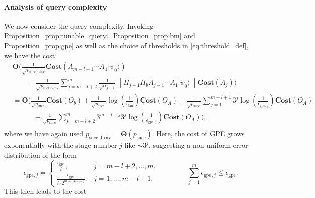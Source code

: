 \documentclass[letterpaper,onecolumn,11pt,accepted=2026-02-14]{quantumarticle}
\newcommand{\norm}[1]{\left\lVert#1\right\rVert}
\theoremstyle{remark}
\theoremstyle{plain}
\newcommand{\eq}[1]{\cref{eq:#1}}
\newcommand{\prop}[1]{\hyperref[prop:#1]{Proposition~\ref*{prop:#1}}}
\newcommand{\ket}[1]{|#1\rangle}
\begin{document}
\paragraph{Analysis of query complexity}
We now consider the query complexity. Invoking \prop{tunable_query}, \prop{bm} and \prop{gpe} as well as the choice of thresholds in \eq{threshold_def}, we have the cost
\begin{equation}
\begin{aligned}
    &\mathbf{O}\Bigg(\frac{1}{\sqrt{p_{\text{succ,d-inv}}}}\mathbf{Cost}\left(A_{m-l+1}\cdots A_{1}\ket{\psi_0}\right)\\
    &\qquad+\frac{1}{\sqrt{p_{\text{succ,d-inv}}}}\sum_{j=m-l+2}^{m}\frac{1}{\sqrt{\alpha_{j-1}}}
    \norm{\overline{\Pi_{j-1}\Pi_b}A_{j-1}\cdots A_1\ket{\psi_0}}\mathbf{Cost}\left(A_{j}\right)\Bigg)\\
    &=\mathbf{O}\Bigg(\frac{1}{\sqrt{p_{\text{succ}}}}\mathbf{Cost}\left(O_b\right)
    +\frac{1}{\sqrt{p_{\text{succ}}}}\log\left(\frac{1}{\epsilon_{\text{bm}}}\right)\mathbf{Cost}\left(O_A\right)
    +\frac{1}{\sqrt{p_{\text{succ}}}}\sum_{j=1}^{m-l+1}3^j\log\left(\frac{1}{\epsilon_{\text{gpe},j}}\right)\mathbf{Cost}(O_A)\\
    &\qquad\quad +\frac{1}{\sqrt{p_{\text{succ}}}}\sum_{j=m-l+2}^{m}3^{m-l-j}3^j\log\left(\frac{1}{\epsilon_{\text{gpe},j}}\right)\mathbf{Cost}\left(O_A\right)\Bigg),\\
\end{aligned}
\end{equation}
where we have again used $p_{\text{succ,d-inv}}=\mathbf{\Theta}\left(p_{\text{succ}}\right)$.
Here, the cost of GPE grows exponentially with the stage number $j$ like $\sim3^j$, suggesting a non-uniform error distribution of the form
\begin{equation}
\label{eq:error_schedule}
    \epsilon_{\text{gpe},j}=
    \begin{cases}
        \frac{\epsilon_{\text{gpe}}}{l},\quad&j=m-l+2,\ldots,m,\\
        \frac{\epsilon_{\text{gpe}}}{l\cdot 2^{m-l+2-j}},&j=1,\ldots,m-l+1,
    \end{cases}
    \qquad\qquad
    \sum_{j=1}^m\epsilon_{\text{gpe},j}
    \leq\epsilon_{\text{gpe}}.
\end{equation}
This then leads to the cost
\end{document}
